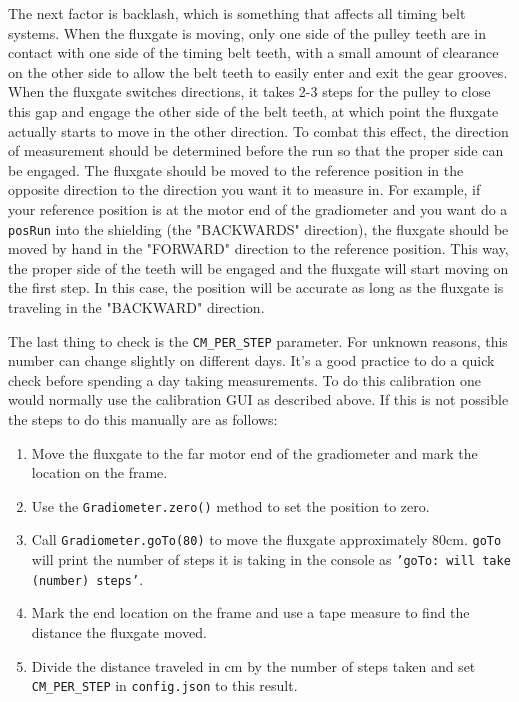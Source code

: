\documentclass{TheMartianReport}
\newcommand{\pyinline}[1]{\texttt{#1}}
\newcommand{\shellinline}[1]{\texttt{#1}}
\begin{document}
The next factor is backlash, which is something that affects all timing belt systems. When the fluxgate is moving, only one side of the pulley teeth are in contact with one side of the timing belt teeth, with a small amount of clearance on the other side to allow the belt teeth to easily enter and exit the gear grooves. When the fluxgate switches directions, it takes 2-3 steps for the pulley to close this gap and engage the other side of the belt teeth, at which point the fluxgate actually starts to move in the other direction. To combat this effect, the direction of measurement should be determined before the run so that the proper side can be engaged. The fluxgate should be moved to the reference position in the opposite direction to the direction you want it to measure in. For example, if your reference position is at the motor end of the gradiometer and you want do a \pyinline{posRun} into the shielding (the "BACKWARDS" direction), the fluxgate should be moved by hand in the "FORWARD" direction to the reference position. This way, the proper side of the teeth will be engaged and the fluxgate will start moving on the first step. In this case, the position will be accurate as long as the fluxgate is traveling in the "BACKWARD" direction.

The last thing to check is the \pyinline{CM_PER_STEP} parameter. For unknown reasons, this number can change slightly on different days. It's a good practice to do a quick check before spending a day taking measurements. To do this calibration one would normally use the calibration GUI as described above. If this is not possible the steps to do this manually are as follows:
\begin{enumerate}
	\item Move the fluxgate to the far motor end of the gradiometer and mark the location on the frame.
	\item Use the \pyinline{Gradiometer.zero()} method to set the position to zero.
	\item Call \pyinline{Gradiometer.goTo(80)} to move the fluxgate approximately 80cm. \pyinline{goTo} will print the number of steps it is taking in the console as \shellinline{'goTo: will take (number) steps'}.
	\item Mark the end location on the frame and use a tape measure to find the distance the fluxgate moved.
	\item Divide the distance traveled in cm by the number of steps taken and set \pyinline{CM_PER_STEP} in \shellinline{config.json} to this result.
\end{enumerate}
\end{document}
